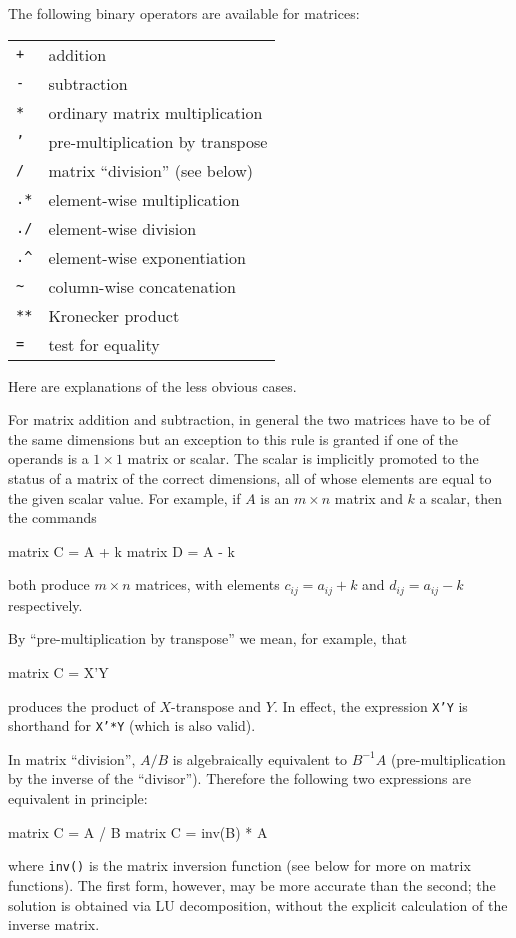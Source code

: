 The following binary operators are available for matrices:

\begin{center}
\begin{tabular}{ll}
\texttt{+} & addition \\
\texttt{-} & subtraction \\
\texttt{*} & ordinary matrix multiplication \\
\texttt{'} & pre-multiplication by transpose \\
\texttt{/} & matrix ``division'' (see below) \\
\texttt{.*} & element-wise multiplication \\
\texttt{./} & element-wise division \\
\verb+.^+ & element-wise exponentiation \\
\verb+~+ & column-wise concatenation \\
\texttt{**} & Kronecker product \\
\texttt{=} & test for equality 
\end{tabular}
\end{center}

Here are explanations of the less obvious cases. 

For matrix addition and subtraction, in general the two matrices have
to be of the same dimensions but an exception to this rule is granted
if one of the operands is a $1\times 1$ matrix or scalar.  The scalar
is implicitly promoted to the status of a matrix of the correct
dimensions, all of whose elements are equal to the given scalar value.
For example, if $A$ is an $m \times n$ matrix and $k$ a scalar, then
the commands
%
\begin{code}
matrix C = A + k
matrix D = A - k
\end{code}
%
both produce $m \times n$ matrices, with elements $c_{ij} = 
a_{ij} + k$ and $d_{ij} = a_{ij} - k$ respectively.

By ``pre-multiplication by transpose'' we mean, for example, that 
%
\begin{code}
matrix C = X'Y
\end{code}
%
produces the product of $X$-transpose and $Y$.  In effect, 
the expression \texttt{X'Y} is shorthand for \texttt{X'*Y}
(which is also valid).

In matrix ``division'', $A/B$ is algebraically equivalent to
$B^{-1}A$ (pre-multiplication by the inverse of the ``divisor'').
Therefore the following two expressions are equivalent in principle:
%
\begin{code}
matrix C = A / B
matrix C = inv(B) * A
\end{code}
%
where \texttt{inv()} is the matrix inversion function (see below for
more on matrix functions).  The first form, however, may be more
accurate than the second; the solution is obtained via LU
decomposition, without the explicit calculation of the inverse matrix.

